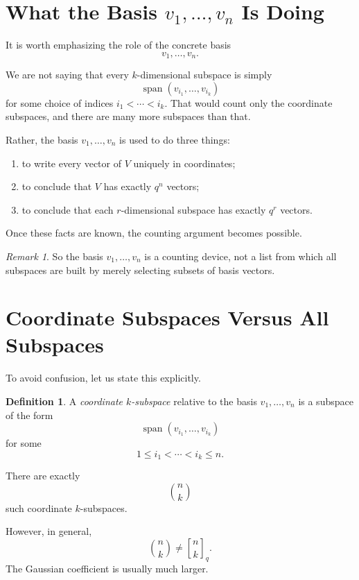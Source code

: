 \documentclass[11pt]{article}
\theoremstyle{definition}
\newtheorem{definition}[theorem]{Definition}
\theoremstyle{remark}
\newtheorem{remark}[theorem]{Remark}
\newcommand{\Span}{\operatorname{span}}
\newcommand{\qbinom}[2]{\genfrac{[}{]}{0pt}{}{#1}{#2}_q}
\begin{document}
	\section{What the Basis \(v_1,\dots,v_n\) Is Doing}
	
	It is worth emphasizing the role of the concrete basis
	\[
	v_1,\dots,v_n.
	\]
	
	We are not saying that every \(k\)-dimensional subspace is simply
	\[
	\Span(v_{i_1},\dots,v_{i_k})
	\]
	for some choice of indices \(i_1<\cdots<i_k\). That would count only the coordinate subspaces, and there are many more subspaces than that.
	
	Rather, the basis \(v_1,\dots,v_n\) is used to do three things:
	
	\begin{enumerate}[label=\arabic*.]
		\item to write every vector of \(V\) uniquely in coordinates;
		\item to conclude that \(V\) has exactly \(q^n\) vectors;
		\item to conclude that each \(r\)-dimensional subspace has exactly \(q^r\) vectors.
	\end{enumerate}
	
	Once these facts are known, the counting argument becomes possible.
	
	\begin{remark}
		So the basis \(v_1,\dots,v_n\) is a counting device, not a list from which all subspaces are built by merely selecting subsets of basis vectors.
	\end{remark}
	
	\section{Coordinate Subspaces Versus All Subspaces}
	
	To avoid confusion, let us state this explicitly.
	
	\begin{definition}
		A \emph{coordinate \(k\)-subspace} relative to the basis \(v_1,\dots,v_n\) is a subspace of the form
		\[
		\Span(v_{i_1},\dots,v_{i_k})
		\]
		for some
		\[
		1\le i_1<\cdots<i_k\le n.
		\]
	\end{definition}
	
	There are exactly
	\[
	\binom{n}{k}
	\]
	such coordinate \(k\)-subspaces.
	
	However, in general,
	\[
	\binom{n}{k}\neq \qbinom{n}{k}.
	\]
	The Gaussian coefficient is usually much larger.
	
\end{document}
